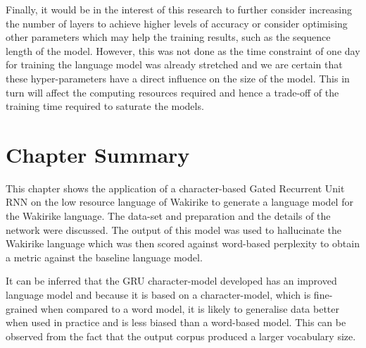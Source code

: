 Finally, it would be in the interest of this research to further consider increasing the number of layers to achieve higher levels of accuracy or consider optimising other parameters which may help the training results, such as the sequence length of the model.  However, this was not done as the time constraint of one day for training the language model was already stretched and we are certain that these hyper-parameters have a direct influence on the size of the model.  This in turn will affect the computing resources required and hence a trade-off of the training time required to saturate the models.



\section{Chapter Summary}
This chapter shows the application of a character-based Gated Recurrent Unit RNN on the low resource language of Wakirike to generate a language model for the Wakirike language.  The data-set and preparation and the details of the network were discussed.  The output of this model was used to hallucinate the Wakirike language which was then scored against word-based perplexity to obtain a metric against the baseline language model.

It can be inferred that the GRU character-model developed has an improved language model and because it is based on a character-model, which is fine-grained when compared to a word model, it is likely to generalise data better when used in practice and is less biased than a word-based model.  This can be observed from the fact that the output corpus produced a larger vocabulary size.
